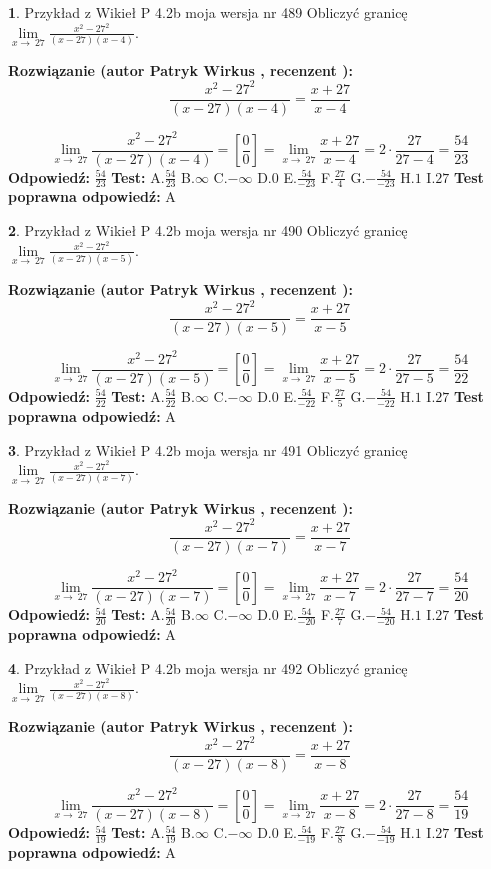 \documentclass[12pt, a4paper]{article}
\theoremstyle{definition} %
\newtheorem{zad}{}
\newcommand{\zadStart}[1]{\begin{zad}#1\newline}
\newcommand{\zadStop}{\end{zad}}
\newcommand{\rozwStart}[2]{\noindent \textbf{Rozwiązanie (autor #1 , recenzent #2): }\newline}
\newcommand{\rozwStop}{\newline}
\newcommand{\odpStart}{\noindent \textbf{Odpowiedź:}\newline}
\newcommand{\odpStop}{\newline}
\newcommand{\testStart}{\noindent \textbf{Test:}\newline}
\newcommand{\testStop}{\newline}
\newcommand{\kluczStart}{\noindent \textbf{Test poprawna odpowiedź:}\newline}
\newcommand{\kluczStop}{\newline}
\begin{document}
\zadStart{Przykład z Wikieł P 4.2b moja wersja nr 489}
Obliczyć granicę $\lim\limits_{x\to\ 27}\frac{x^{2}-27^{2}}{(x-27)(x-4)}$.
\zadStop
\rozwStart{Patryk Wirkus}{}
$$\frac{x^{2}-27^{2}}{(x-27)(x-4)}=\frac{x+27}{x-4}$$

$$\lim\limits_{x\to\ 27}\frac{x^{2}-27^{2}}{(x-27)(x-4)}=[\frac{0}{0}]=\lim\limits_{x\to\ 27}\frac{x+27}{x-4}=2 \cdot \frac{27}{27-4} = \frac{54}{23}$$
\rozwStop
\odpStart
$\frac{54}{23}$
\odpStop
\testStart
A.$\frac{54}{23}$
B.$\infty$
C.$-\infty$
D.$0$
E.$\frac{54}{-23}$
F.$\frac{27}{4}$
G.$-\frac{54}{-23}$
H.$1$
I.$27$
\testStop
\kluczStart
A
\kluczStop



\zadStart{Przykład z Wikieł P 4.2b moja wersja nr 490}
Obliczyć granicę $\lim\limits_{x\to\ 27}\frac{x^{2}-27^{2}}{(x-27)(x-5)}$.
\zadStop
\rozwStart{Patryk Wirkus}{}
$$\frac{x^{2}-27^{2}}{(x-27)(x-5)}=\frac{x+27}{x-5}$$

$$\lim\limits_{x\to\ 27}\frac{x^{2}-27^{2}}{(x-27)(x-5)}=[\frac{0}{0}]=\lim\limits_{x\to\ 27}\frac{x+27}{x-5}=2 \cdot \frac{27}{27-5} = \frac{54}{22}$$
\rozwStop
\odpStart
$\frac{54}{22}$
\odpStop
\testStart
A.$\frac{54}{22}$
B.$\infty$
C.$-\infty$
D.$0$
E.$\frac{54}{-22}$
F.$\frac{27}{5}$
G.$-\frac{54}{-22}$
H.$1$
I.$27$
\testStop
\kluczStart
A
\kluczStop



\zadStart{Przykład z Wikieł P 4.2b moja wersja nr 491}
Obliczyć granicę $\lim\limits_{x\to\ 27}\frac{x^{2}-27^{2}}{(x-27)(x-7)}$.
\zadStop
\rozwStart{Patryk Wirkus}{}
$$\frac{x^{2}-27^{2}}{(x-27)(x-7)}=\frac{x+27}{x-7}$$

$$\lim\limits_{x\to\ 27}\frac{x^{2}-27^{2}}{(x-27)(x-7)}=[\frac{0}{0}]=\lim\limits_{x\to\ 27}\frac{x+27}{x-7}=2 \cdot \frac{27}{27-7} = \frac{54}{20}$$
\rozwStop
\odpStart
$\frac{54}{20}$
\odpStop
\testStart
A.$\frac{54}{20}$
B.$\infty$
C.$-\infty$
D.$0$
E.$\frac{54}{-20}$
F.$\frac{27}{7}$
G.$-\frac{54}{-20}$
H.$1$
I.$27$
\testStop
\kluczStart
A
\kluczStop



\zadStart{Przykład z Wikieł P 4.2b moja wersja nr 492}
Obliczyć granicę $\lim\limits_{x\to\ 27}\frac{x^{2}-27^{2}}{(x-27)(x-8)}$.
\zadStop
\rozwStart{Patryk Wirkus}{}
$$\frac{x^{2}-27^{2}}{(x-27)(x-8)}=\frac{x+27}{x-8}$$

$$\lim\limits_{x\to\ 27}\frac{x^{2}-27^{2}}{(x-27)(x-8)}=[\frac{0}{0}]=\lim\limits_{x\to\ 27}\frac{x+27}{x-8}=2 \cdot \frac{27}{27-8} = \frac{54}{19}$$
\rozwStop
\odpStart
$\frac{54}{19}$
\odpStop
\testStart
A.$\frac{54}{19}$
B.$\infty$
C.$-\infty$
D.$0$
E.$\frac{54}{-19}$
F.$\frac{27}{8}$
G.$-\frac{54}{-19}$
H.$1$
I.$27$
\testStop
\kluczStart
A
\kluczStop
\end{document}
